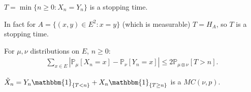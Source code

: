 \begin{defn}
	$T=\min\{n\geq 0: X_n=Y_n\}$ is a stopping time.
\end{defn}
\begin{rmk}[]
	In fact for $A = \{ (x,y) \in E^2: x=y\}$ (which is measurable) $T=H_A$, so $T$ is a stopping time.
\end{rmk}


\begin{prop}[]
	For $\mu, \nu $ distributions on $E$, $n\geq 0$: 
\begin{align}
	\boxed{ \sum_{x \in E}^{} |\mathbb{P}_{\mu } \left[ X_n=x \right] - \mathbb{P}_{\nu} \left[Y_n=x  \right] | \leq 2 \mathbb{P}_{\mu \otimes \nu } \left[ T>n \right] }
.\end{align}
\end{prop}
\begin{lemma}[]
	$\tilde{X}_n = Y_n \mathbbm{1}_{\{T<n\}} + X_n \mathbbm{1}_{\{T \geq n\}} $ is a $MC(\nu, p)$.
\end{lemma}
